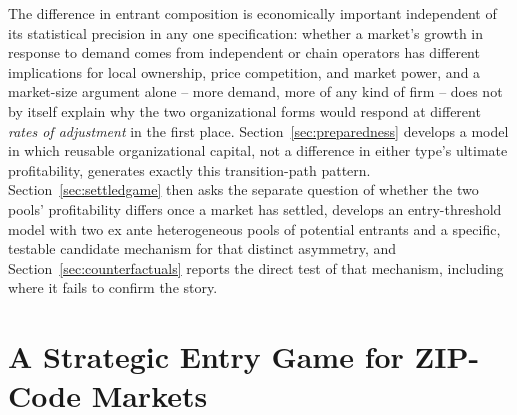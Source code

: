 \documentclass[english,12pt]{article}
\begin{document}
The difference in entrant composition is economically important independent of its statistical precision in any one specification: whether a market's growth in response to demand comes from independent or chain operators has different implications for local ownership, price competition, and market power, and a market-size argument alone -- more demand, more of any kind of firm -- does not by itself explain why the two organizational forms would respond at different \emph{rates of adjustment} in the first place. Section~\ref{sec:preparedness} develops a model in which reusable organizational capital, not a difference in either type's ultimate profitability, generates exactly this transition-path pattern. Section~\ref{sec:settledgame} then asks the separate question of whether the two pools' profitability differs once a market has settled, develops an entry-threshold model with two ex ante heterogeneous pools of potential entrants and a specific, testable candidate mechanism for that distinct asymmetry, and Section~\ref{sec:counterfactuals} reports the direct test of that mechanism, including where it fails to confirm the story.

\FloatBarrier

\section{A Strategic Entry Game for ZIP-Code Markets}
\label{sec:model}
\end{document}
